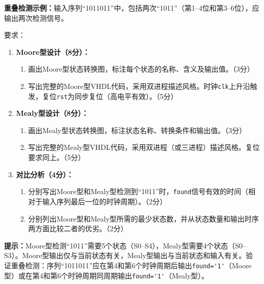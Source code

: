 \begin{framed}
\textbf{重叠检测示例：}输入序列``1011011''中，包括两次``1011''（第1--4位和第3--6位），应输出两次检测信号。
\end{framed}

要求：

\begin{enumerate}[label=(\arabic*)]
  \item \textbf{Moore型设计（8分）：}
  \begin{enumerate}
    \item 画出Moore型状态转换图，标注每个状态的名称、含义及输出值。（3分）
    \item 写出完整的Moore型VHDL代码，采用双进程描述风格。时钟\verb|clk|上升沿触发，复位\verb|rst|为同步复位（高电平有效）。（5分）
  \end{enumerate}
  \item \textbf{Mealy型设计（8分）：}
  \begin{enumerate}
    \item 画出Mealy型状态转换图，标注状态名称、转换条件和输出值。（3分）
    \item 写出完整的Mealy型VHDL代码，采用双进程（或三进程）描述风格。复位要求同上。（5分）
  \end{enumerate}
  \item \textbf{对比分析（4分）：}
  \begin{enumerate}
    \item 分别写出Moore型和Mealy型检测到``1011''时，\verb|found|信号有效的时间（相对于输入序列最后一位的时钟周期）。（2分）
    \item 分别列出Moore型和Mealy型所需的最少状态数，并从状态数量和输出时序两方面比较二者的优劣。（2分）
  \end{enumerate}
\end{enumerate}

\begin{framed}
\textbf{提示：}Moore型检测``1011''需要5个状态（S0--S4），Mealy型需要4个状态（S0--S3）。Moore型输出仅与当前状态有关，Mealy型输出与当前状态和输入有关。验证重叠检测：序列``1011011''应在第4和第6个时钟周期后输出\verb|found='1'|（Moore型）或在第4和第6个时钟周期同周期输出\verb|found='1'|（Mealy型）。
\end{framed}

\endinput
